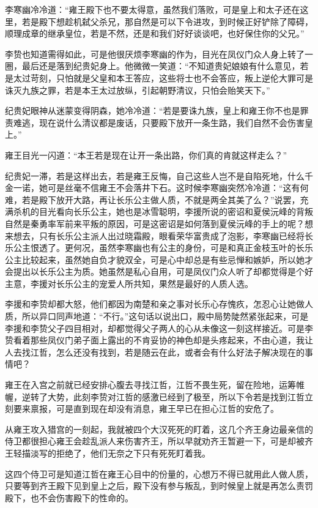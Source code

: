 李寒幽冷冷道：“雍王殿下也不要太得意，虽然我们落败，可是皇上和太子还在这里，若是殿下想趁机弑父杀兄，那自然是可以下令进攻，到时候正好铲除了障碍，顺理成章的继承皇位，若是不然，还是和我们好好谈谈吧，也好保住你的父兄。”

李贽也知道需得如此，可是他很厌烦李寒幽的作为，目光在凤仪门众人身上转了一圈，最后还是落到纪贵妃身上。他微微一笑道：“不知道贵妃娘娘有什么意见，若是太过苛刻，只怕就是父皇和本王答应，这些将士也不会答应，叛上逆伦大罪可是诛灭九族之罪，若是本王太过放纵，引起朝野清议，只怕会贻笑天下。”

纪贵妃眼神从迷蒙变得阴森，她冷冷道：“若是要诛九族，皇上和雍王你不也是罪责难逃，现在说什么清议都是废话，只要殿下放开一条生路，我们自然不会伤害皇上。”

雍王目光一闪道：“本王若是现在让开一条出路，你们真的肯就这样走么？”

纪贵妃一滞，若是这样出去，若是雍王反悔，自己这些人岂不是自陷死地，什么千金一诺，她可是丝毫不信雍王不会落井下石。这时候李寒幽突然冷冷道：“这有何难，若是殿下放开大路，再让长乐公主做人质，不就是两全其美了么？”说罢，充满杀机的目光看向长乐公主，她也是冰雪聪明，李援所说的密诏和夏侯沅峰的背叛自然是秦勇率军前来平叛的原因，可是这密诏是如何落到夏侯沅峰的手上的呢？想来想去，只有长乐公主派人出过晓霜殿，眼看荣华富贵成了泡影，李寒幽已经将长乐公主恨透了。更何况，虽然李寒幽也有公主的身份，可是和真正金枝玉叶的长乐公主比较起来，虽然她自负才貌双全，可是心中却总是有些忌惮和嫉妒，所以她才会提出以长乐公主为质。她虽然是私心自用，可是凤仪门众人听了却都觉得是个好主意，李援对长乐公主的宠爱人所共知，果然是最好的人质人选。

李援和李贽却都大怒，他们都因为南楚和亲之事对长乐心存愧疚，怎忍心让她做人质，所以异口同声地道：“不行。”这句话以说出口，殿中局势陡然紧张起来，可是李援和李贽父子四目相对，却都觉得父子两人的心从未像这一刻这样接近。可是李贽看着那些凤仪门弟子面上露出的不肯妥协的神色却是头疼起来，不由心道，我让人去找江哲，怎么还没有找到，若是随云在此，或者会有什么好法子解决现在的事情吧？

雍王在入宫之前就已经安排心腹去寻找江哲，江哲不畏生死，留在险地，运筹帷幄，逆转了大势，此刻李贽对江哲的感激已经到了极至，所以下令若是找到江哲立刻要来禀报，可是直到现在却没有消息，雍王早已在担心江哲的安危了。

从雍王攻入猎宫的一刻起，我就被四个大汉死死的盯着，这几个齐王身边最亲信的侍卫都很担心雍王会趁乱派人来伤害齐王，所以早就劝齐王暂避一下，可是却被齐王轻描淡写的拒绝了，他们无奈之下只有死死盯着我。

这四个侍卫可是知道江哲在雍王心目中的份量的，心想万不得已就用此人做人质，只要等到齐王殿下见到皇上之后，殿下没有参与叛乱，到时候皇上就是再怎么责罚殿下，也不会伤害殿下的性命的。


